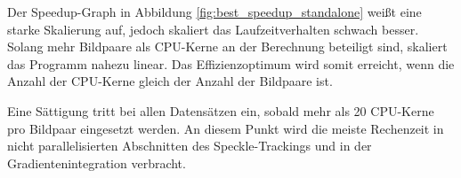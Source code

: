 Der Speedup-Graph in Abbildung \ref{fig:best_speedup_standalone} weißt eine starke Skalierung auf, jedoch skaliert das Laufzeitverhalten schwach besser. Solang mehr Bildpaare als \gls{CPU}-Kerne an der Berechnung beteiligt sind, skaliert das Programm nahezu linear. Das Effizienzoptimum wird somit erreicht, wenn die Anzahl der \gls{CPU}-Kerne gleich der Anzahl der Bildpaare ist. 

Eine Sättigung tritt bei allen Datensätzen ein, sobald mehr als 20 \gls{CPU}-Kerne pro Bildpaar eingesetzt werden. An diesem Punkt wird die meiste Rechenzeit in nicht parallelisierten Abschnitten des Speckle-Trackings und in der Gradientenintegration verbracht.
